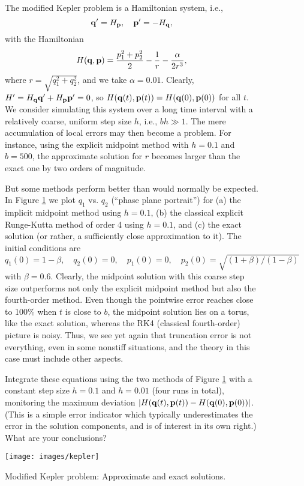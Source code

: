 \begin{figure}
  \begin{problem}[A\&P 4.19]
    The modified Kepler problem is a Hamiltonian system, i.e., 
    \[
      \mathbf{q}' = H_{\mathbf{p}}, \quad \mathbf{p}' = -H_{\mathbf{q}},
    \]
    with the Hamiltonian
    \[
      H(\mathbf{q}, \mathbf{p}) = \frac{p_1^2 + p_2^2}{2} - \frac1r - \frac{\alpha}{2r^3},
    \]
    where $r = \sqrt{q_1^2 + q_2^2}$, and we take $\alpha = 0.01$. Clearly, $H' = H_{\mathbf{q}} \mathbf{q}' + H_{\mathbf{p}} \mathbf{p}' = 0$, so $H(\mathbf{q}(t), \mathbf{p}(t)) = H(\mathbf{q}(0), \mathbf{p}(0))$ for all $t$. We consider simulating this system over a long time interval with a relatively coarse, uniform step size $h$, i.e., $bh \gg 1$. The mere accumulation of local errors may then become a problem. For instance, using the explicit midpoint method with $h = 0.1$ and $b = 500$, the approximate solution for $r$ becomes larger than the exact one by two orders of magnitude.
  
    But some methods perform better than would normally be expected. In Figure \ref{F:kepler} we plot $q_1$ vs. $q_2$ (``phase plane portrait'') for (a) the implicit midpoint method using $h = 0.1$, (b) the classical explicit Runge-Kutta method of order 4 using $h = 0.1$, and (c) the exact solution (or rather, a sufficiently close approximation to it). The initial conditions are
    \[
      q_1(0) = 1 - \beta, \quad q_2(0) = 0, \quad p_1(0) = 0, \quad p_2(0) = \sqrt{(1 + \beta)/(1 - \beta)}
    \]
    with $\beta = 0.6$. Clearly, the midpoint solution with this coarse step size outperforms not only the explicit midpoint method but also the fourth-order method. Even though the pointwise error reaches close to 100\% when $t$ is close to $b$, the midpoint solution lies on a torus, like the exact solution, whereas the RK4 (classical fourth-order) picture is noisy. Thus, we see yet again that truncation error is not everything, even in some nonstiff situations, and the theory in this case must include other aspects.
  
    Integrate these equations using the two methods of Figure \ref{F:kepler} with a constant step size $h = 0.1$ and $h = 0.01$ (four runs in total), monitoring the maximum deviation $|H(\mathbf{q}(t), \mathbf{p}(t)) - H( \mathbf{q}(0),\mathbf{p}(0))|$. (This is a simple error indicator which typically underestimates the error in the solution components, and is of interest in its own right.) What are your conclusions?
    
    \centering
    \texttt{[image: images/kepler]}
    \caption{Modified Kepler problem: Approximate and exact solutions.}
    \label{F:kepler}
  \end{problem}
\end{figure}

\FloatBarrier

\begin{solution}
  
\end{solution}